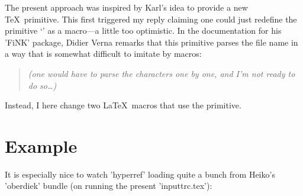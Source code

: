 \documentclass[fleqn]{article}%
\begin{document}
The present approach was inspired by Karl's idea to provide a new 
\TeX\ primitive. This first triggered my 
reply
claiming one could just redefine the primitive `' as a macro---a 
little too optimistic. In the documentation for his 'FiNK'
package,
Didier Verna remarks that this primitive parses the file name 
in a way that is somewhat difficult to imitate 
by %
macros: 
\begin{quote}\itshape\small
(one would have to parse the characters one by one, 
 and I'm not ready to do so\dots)
\end{quote}
Instead, I here change two \LaTeX\ macros that use the primitive. 

\section{Example}
It is especially nice to watch 'hyperref' loading quite a bunch 
from Heiko's 'oberdiek' bundle (on running the present 
 'inputtrc.tex'):
\begingroup \hfuzz=10pc \small
\end{document}
